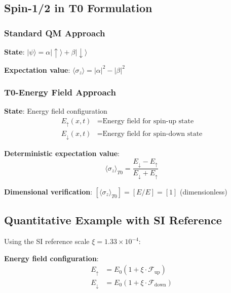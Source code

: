 \documentclass[12pt,a4paper]{article}
\newcommand{\Efield}{E}
\newcommand{\xipar}{\xi}
\begin{document}
	\subsection{Spin-1/2 in T0 Formulation}
	
	\subsubsection{Standard QM Approach}
	
	\textbf{State}: $|\psi\rangle = \alpha|{\uparrow}\rangle + \beta|{\downarrow}\rangle$
	
	\textbf{Expectation value}: $\langle \sigma_z \rangle = |\alpha|^2 - |\beta|^2$
	
	\subsubsection{T0-Energy Field Approach}
	
	\textbf{State}: Energy field configuration
	\begin{align}
		\Efield_{\uparrow}(x,t) &= \text{Energy field for spin-up state} \\
		\Efield_{\downarrow}(x,t) &= \text{Energy field for spin-down state}
	\end{align}
	
	\textbf{Deterministic expectation value}:
	\begin{equation}
		\boxed{\langle \sigma_z \rangle_{T0} = \frac{\Efield_{\downarrow} - \Efield_{\uparrow}}{\Efield_{\downarrow} + \Efield_{\uparrow}}}
		\label{eq:deterministic_spin_z}
	\end{equation}
	
	\textbf{Dimensional verification}: $[\langle \sigma_z \rangle_{T0}] = [E/E] = [1]$ (dimensionless) \checkmark
	
	\subsection{Quantitative Example with SI Reference}
	
	Using the SI reference scale $\xipar = 1.33 \times 10^{-4}$:
	
	\textbf{Energy field configuration}:
	\begin{align}
		\Efield_{\uparrow} &= E_0 (1 + \xipar \cdot \mathcal{F}_{\text{up}}) \\
		\Efield_{\downarrow} &= E_0 (1 + \xipar \cdot \mathcal{F}_{\text{down}})
	\end{align}
	
\end{document}
